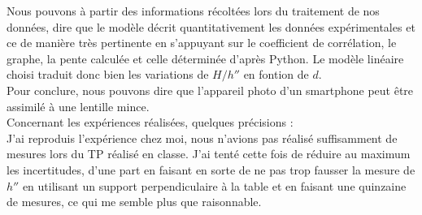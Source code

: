 \documentclass[12pt,a4paper]{article}
\begin{document}
Nous pouvons à partir des informations récoltées lors du traitement de nos données, dire que le modèle décrit quantitativement les données expérimentales et ce de manière très pertinente en s'appuyant sur le coefficient de corrélation, le graphe, la pente calculée et celle déterminée d'après Python. Le modèle linéaire choisi traduit donc bien les variations de $H/h''$ en fontion de $d$.\\
Pour conclure, nous pouvons dire que l'appareil photo d'un smartphone peut être assimilé à une lentille mince.\\

Concernant les expériences réalisées, quelques précisions : \\

J'ai reproduis l'expérience chez moi, nous n'avions pas réalisé suffisamment de mesures lors du TP réalisé en classe. J'ai tenté cette fois de réduire au maximum les incertitudes, d'une part en faisant en sorte de ne pas trop fausser la mesure de $h''$ en utilisant un support perpendiculaire à la table et en faisant une quinzaine de mesures, ce qui me semble plus que raisonnable.
\end{document}
